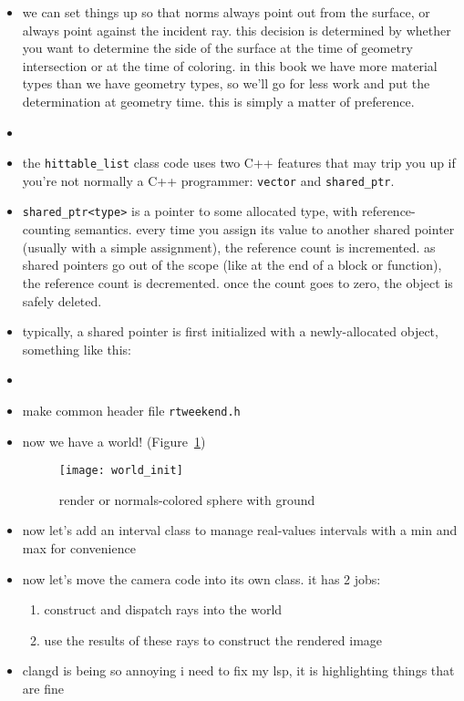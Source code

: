 \begin{itemize}
    \item we can set things up so that norms always point out from the surface,
        or always point against the incident ray. this decision is determined by
        whether you want to determine the side of the surface at the time of
        geometry intersection or at the time of coloring. in this book we have
        more material types than we have geometry types, so we'll go for less
        work and put the determination at geometry time. this is simply a matter
        of preference.
    \item %
    \item the \texttt{hittable_list} class code uses two C++ features that may
        trip you up if you're not normally a C++ programmer: \texttt{vector} and
        \texttt{shared_ptr}.
    \item \texttt{shared_ptr<type>} is a pointer to some allocated type, with
        reference-counting semantics. every time you assign its value to another
        shared pointer (usually with a simple assignment), the reference count
        is incremented. as shared pointers go out of the scope (like at the end
        of a block or function), the reference count is decremented. once the
        count goes to zero, the object is safely deleted.
    \item typically, a shared pointer is first initialized with a
        newly-allocated object, something like this:
    \item %
    \item make common header file \texttt{rtweekend.h}

        \clearpage

    \item now we have a world! (Figure~\ref{fig:world_init})
        \begin{figure}[ht]
            \centering
            \texttt{[image: world\_init]}
            \captionsetup{labelfont=bf, textfont=it}
            \caption{render or normals-colored sphere with ground}
            \label{fig:world_init}
        \end{figure}
    \item now let's add an interval class to manage real-values intervals with a
        min and max for convenience
    \item now let's move the camera code into its own class. it has 2 jobs:
        \begin{enumerate}
            \item construct and dispatch rays into the world
            \item use the results of these rays to construct the rendered image
        \end{enumerate}
    \item clangd is being so annoying i need to fix my lsp, it is highlighting
        things that are fine
\end{itemize}
